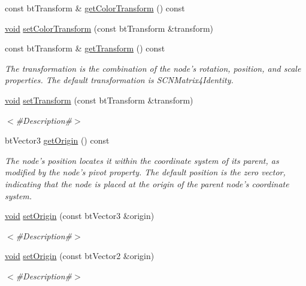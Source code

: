 \begin{DoxyCompactItemize}
const bt\+Transform \& \mbox{\hyperlink{classnjli_1_1_node_a05480357b853195997e5ef255a6f2e70}{get\+Color\+Transform}} () const
\item 
\mbox{\hyperlink{_thread_8h_af1e856da2e658414cb2456cb6f7ebc66}{void}} \mbox{\hyperlink{classnjli_1_1_node_af52fa39a8c2869ddcd48b452d423fc26}{set\+Color\+Transform}} (const bt\+Transform \&transform)
\item 
const bt\+Transform \& \mbox{\hyperlink{classnjli_1_1_node_ae54076fc2201492cead884c2dc7407b9}{get\+Transform}} () const
\begin{DoxyCompactList}\small\item\em The transformation is the combination of the node’s rotation, position, and scale properties. The default transformation is S\+C\+N\+Matrix4\+Identity. \end{DoxyCompactList}\item 
\mbox{\hyperlink{_thread_8h_af1e856da2e658414cb2456cb6f7ebc66}{void}} \mbox{\hyperlink{classnjli_1_1_node_a86a7e9e1fea1e47a9baad47b6c5caca3}{set\+Transform}} (const bt\+Transform \&transform)
\begin{DoxyCompactList}\small\item\em $<$\#\+Description\#$>$ \end{DoxyCompactList}\item 
bt\+Vector3 \mbox{\hyperlink{classnjli_1_1_node_a3258ee7eeedc10261985f5d5eb4e765d}{get\+Origin}} () const
\begin{DoxyCompactList}\small\item\em The node’s position locates it within the coordinate system of its parent, as modified by the node’s pivot property. The default position is the zero vector, indicating that the node is placed at the origin of the parent node’s coordinate system. \end{DoxyCompactList}\item 
\mbox{\hyperlink{_thread_8h_af1e856da2e658414cb2456cb6f7ebc66}{void}} \mbox{\hyperlink{classnjli_1_1_node_a16a10ec08e52af2b11258d84a243c0bd}{set\+Origin}} (const bt\+Vector3 \&origin)
\begin{DoxyCompactList}\small\item\em $<$\#\+Description\#$>$ \end{DoxyCompactList}\item 
\mbox{\hyperlink{_thread_8h_af1e856da2e658414cb2456cb6f7ebc66}{void}} \mbox{\hyperlink{classnjli_1_1_node_a4254472727081479bc1df40b9dc9c4f4}{set\+Origin}} (const bt\+Vector2 \&origin)
\begin{DoxyCompactList}\small\item\em $<$\#\+Description\#$>$ \end{DoxyCompactList}\item 

\end{DoxyCompactItemize}
